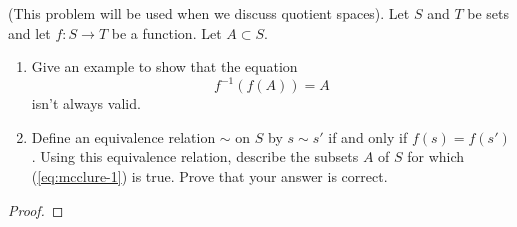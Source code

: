 \begin{problem}[C]
(This problem will be used when we discuss quotient spaces). Let
$S$ and $T$ be sets and let $f\colon S\to T$ be a function. Let
$A\subset S$.
\begin{enumerate}[noitemsep,label=(\roman*)]
\item Give an example to show that the equation
\begin{equation}
\label{eq:mcclure-1}
\tag{*}
f^{-1}(f(A))=A
\end{equation}
isn't always valid.
\item Define an equivalence relation $\sim$ on $S$ by $s\sim s'$
  if and only if $f(s)=f(s')$. Using this equivalence relation,
  describe the subsets $A$ of $S$ for which (\ref{eq:mcclure-1}) is
  true. Prove that your answer is correct.
\end{enumerate}
\end{problem}
\begin{proof}
\end{proof}


